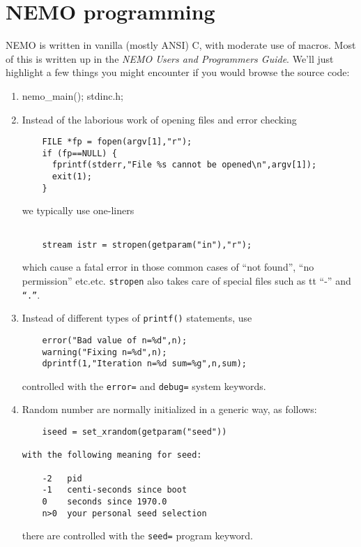 \chapter                {NEMO programming}

NEMO is written in vanilla (mostly ANSI) C, with moderate use of
macros. Most of this is written up in the 
{\it NEMO Users and Programmers Guide}. We'll just highlight a few 
things you might encounter if you would browse the source code:

\begin{enumerate}

\item
nemo\_main(); stdinc.h;

\item
Instead of the laborious work of opening files and error checking

\footnotesize\begin{verbatim}
    FILE *fp = fopen(argv[1],"r");
    if (fp==NULL) {
      fprintf(stderr,"File %s cannot be opened\n",argv[1]);
      exit(1);
    }
\end{verbatim}\normalsize

we typically use one-liners
\footnotesize\begin{verbatim}

    stream istr = stropen(getparam("in"),"r");
\end{verbatim}\normalsize
which cause a fatal error 
in those common cases of ``not found'', ``no permission'' etc.etc.
{\tt stropen} also takes care of special files such as {tt ``-''} and {\tt ``.''}.

\item
Instead of different types of {\tt printf()} statements, use
\footnotesize\begin{verbatim}
    error("Bad value of n=%d",n);
    warning("Fixing n=%d",n);
    dprintf(1,"Iteration n=%d sum=%g",n,sum);
\end{verbatim}\normalsize
controlled with the {\tt error=} and {\tt debug=} system keywords.

\item
Random number are normally initialized in a generic way, as follows:
\footnotesize\begin{verbatim}
    iseed = set_xrandom(getparam("seed"))

with the following meaning for seed:

    -2   pid
    -1   centi-seconds since boot
    0    seconds since 1970.0
    n>0  your personal seed selection
\end{verbatim}\normalsize

there are controlled with the  {\tt seed=} program keyword.


\end{enumerate}

